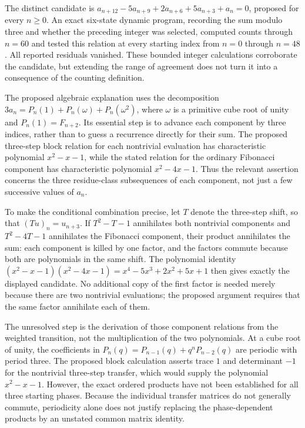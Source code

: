 \documentclass[11pt]{article}
\begin{document}
The distinct candidate is $a_{n+12}-5a_{n+9}+2a_{n+6}+5a_{n+3}+a_n=0$, proposed for every $n\geq 0$. An exact six-state dynamic program, recording the sum modulo three and whether the preceding integer was selected, computed counts through $n=60$ and tested this relation at every starting index from $n=0$ through $n=48$. All reported residuals vanished. These bounded integer calculations corroborate the candidate, but extending the range of agreement does not turn it into a consequence of the counting definition.

The proposed algebraic explanation uses the decomposition $3a_n=P_n(1)+P_n(\omega)+P_n(\omega^2)$, where $\omega$ is a primitive cube root of unity and $P_n(1)=F_{n+2}$. Its essential step is to advance each component by three indices, rather than to guess a recurrence directly for their sum. The proposed three-step block relation for each nontrivial evaluation has characteristic polynomial $x^2-x-1$, while the stated relation for the ordinary Fibonacci component has characteristic polynomial $x^2-4x-1$. Thus the relevant assertion concerns the three residue-class subsequences of each component, not just a few successive values of $a_n$.

To make the conditional combination precise, let $T$ denote the three-step shift, so that $(Tu)_n=u_{n+3}$. If $T^2-T-1$ annihilates both nontrivial components and $T^2-4T-1$ annihilates the Fibonacci component, their product annihilates the sum: each component is killed by one factor, and the factors commute because both are polynomials in the same shift. The polynomial identity $(x^2-x-1)(x^2-4x-1)=x^4-5x^3+2x^2+5x+1$ then gives exactly the displayed candidate. No additional copy of the first factor is needed merely because there are two nontrivial evaluations; the proposed argument requires that the same factor annihilate each of them.

The unresolved step is the derivation of those component relations from the weighted transition, not the multiplication of the two polynomials. At a cube root of unity, the coefficients in $P_n(q)=P_{n-1}(q)+q^nP_{n-2}(q)$ are periodic with period three. The proposed block calculation asserts trace $1$ and determinant $-1$ for the nontrivial three-step transfer, which would supply the polynomial $x^2-x-1$. However, the exact ordered products have not been established for all three starting phases. Because the individual transfer matrices do not generally commute, periodicity alone does not justify replacing the phase-dependent products by an unstated common matrix identity.
\end{document}

